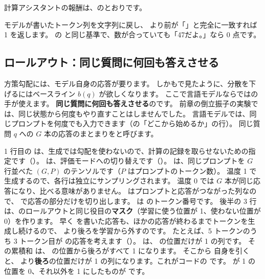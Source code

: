 計算アシスタントの報酬は、のとおりです。


モデルが書いたトークン列を文字列に戻し、 より前が「」と完全に一致すれば 1 を返します。
の  と同じ基準で、数が合っていても「47だよ。」なら 0 点です。

\subsection{ロールアウト：同じ質問に何回も答えさせる}

方策勾配には、モデル自身の応答が要ります。
しかもで見たように、分散を下げるにはベースライン $b(q)$ が欲しくなります。
ここで言語モデルならではの手が使えます。
\textbf{同じ質問に何回も答えさせる}のです。
前章の倒立振子の実験では、同じ状態から何度もやり直すことはしませんでした。
言語モデルでは、同じプロンプトを何度でも入力できます（の「どこから始めるか」の行）。
同じ質問 $q$ への $G$ 本の応答のまとまりをと呼びます。


1 行目の  は、生成では勾配を使わないので、計算の記録を取らせないための指定です（）。
 は、評価モードへの切り替えです（）。
 は、同じプロンプトを $G$ 行並べた $(G,P)$ のテンソルです（$P$ はプロンプトのトークン数）。
温度 1 で生成するので、各行は独立にサンプリングされます。
温度 0 では $G$ 本が同じ応答になり、比べる意味がありません。
 はプロンプトと応答がつながった列なので、 で応答の部分だけを切り出します。
 は  のトークン番号です。
後半の 3 行は、のロールアウトと同じ役目の\textbf{マスク}（学習に使う位置が 1、使わない位置が 0）を作ります。
早く  を書いた応答も、ほかの応答が終わるまでトークンを生成し続けるので、 より後ろを学習から外すのです。
たとえば、5 トークンのうち 3 トークン目が  の応答を考えます（）。
 は、 の位置だけが 1 の列です。
その累積和  は、 の位置から後ろがすべて 1 になります。
そこから  自身を引くと、 より\textbf{後ろ}の位置だけが 1 の列になります。これがコードの  です。
 が 1 の位置を 0、それ以外を 1 にしたものが  です。

